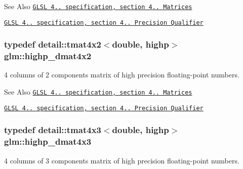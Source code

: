 \begin{DoxySeeAlso}{See Also}
\href{http://www.opengl.org/registry/doc/GLSLangSpec.4.20.8.pdf}{\tt G\-L\-S\-L 4.. specification, section 4.. Matrices} 

\href{http://www.opengl.org/registry/doc/GLSLangSpec.4.20.8.pdf}{\tt G\-L\-S\-L 4.. specification, section 4.. Precision Qualifier} 
\end{DoxySeeAlso}
\hypertarget{group__core__precision_gaa4fb1ed350a6cd053abb9b093d13ce0d}{
\subsubsection[{highp\-\_\-dmat4x2}]{\setlength{\rightskip}{0pt plus 5cm}typedef detail\-::tmat4x2$<$double, highp$>$ {\bf glm\-::highp\-\_\-dmat4x2}}}\label{group__core__precision_gaa4fb1ed350a6cd053abb9b093d13ce0d}
4 columns of 2 components matrix of high precision floating-\/point numbers.

\begin{DoxySeeAlso}{See Also}
\href{http://www.opengl.org/registry/doc/GLSLangSpec.4.20.8.pdf}{\tt G\-L\-S\-L 4.. specification, section 4.. Matrices} 

\href{http://www.opengl.org/registry/doc/GLSLangSpec.4.20.8.pdf}{\tt G\-L\-S\-L 4.. specification, section 4.. Precision Qualifier} 
\end{DoxySeeAlso}
\hypertarget{group__core__precision_gaf8aeba0eecc5c651e0f06414b6e37754}{
\subsubsection[{highp\-\_\-dmat4x3}]{\setlength{\rightskip}{0pt plus 5cm}typedef detail\-::tmat4x3$<$double, highp$>$ {\bf glm\-::highp\-\_\-dmat4x3}}}\label{group__core__precision_gaf8aeba0eecc5c651e0f06414b6e37754}
4 columns of 3 components matrix of high precision floating-\/point numbers.

